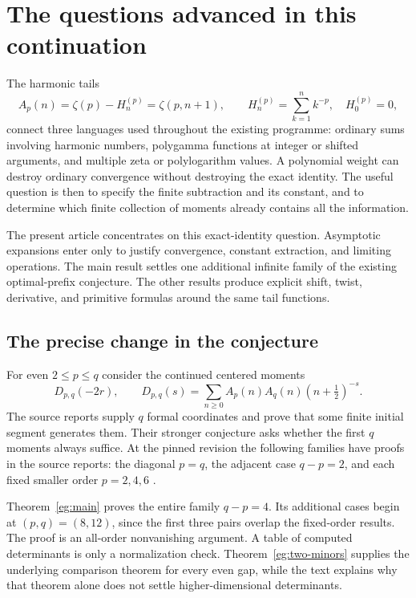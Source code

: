 \documentclass[11pt]{article}
\theoremstyle{definition}
\theoremstyle{remark}
\numberwithin{equation}{section}
\begin{document}
\section{The questions advanced in this continuation}
\label{sec:scope}

The harmonic tails
\[
 A_p(n)=\zeta(p)-H_n^{(p)}=\zeta(p,n+1),\qquad
 H_n^{(p)}=\sum_{k=1}^n k^{-p},\quad H_0^{(p)}=0,
\]
connect three languages used throughout the existing programme:
ordinary sums involving harmonic numbers, polygamma functions at
integer or shifted arguments, and multiple zeta or polylogarithm
values. A polynomial weight can destroy ordinary convergence without
destroying the exact identity. The useful question is then to specify
the finite subtraction and its constant, and to determine which
finite collection of moments already contains all the information.

The present article concentrates on this exact-identity question.
Asymptotic expansions enter only to justify convergence, constant
extraction, and limiting operations. The main result settles one
additional infinite family of the existing optimal-prefix conjecture.
The other results produce explicit shift, twist, derivative, and
primitive formulas around the same tail functions.

\subsection{The precise change in the conjecture}

For even $2\le p\le q$ consider the continued centered moments
\[
 D_{p,q}(-2r),\qquad
 D_{p,q}(s)=\sum_{n\ge0}
       A_p(n)A_q(n)(n+\tfrac12)^{-s}.
\]
The source reports supply $q$ formal coordinates and prove that
some finite initial segment generates them. Their stronger conjecture
asks whether the first $q$ moments always suffice. At the pinned
revision the following families have proofs in the source reports:
the diagonal $p=q$, the adjacent case $q-p=2$, and each fixed smaller
order $p=2,4,6$ \cite{Canonical,Differential,Bernoulli,Polygamma}.

Theorem~\ref{eg:main} proves the entire family $q-p=4$.
Its additional cases begin at $(p,q)=(8,12)$, since the first three
pairs overlap the fixed-order results. The proof is an all-order
nonvanishing argument. A table of computed determinants is only a
normalization check. Theorem~\ref{eg:two-minors} supplies the underlying
comparison theorem for every even gap, while the text explains why
that theorem alone does not settle higher-dimensional determinants.
\end{document}
